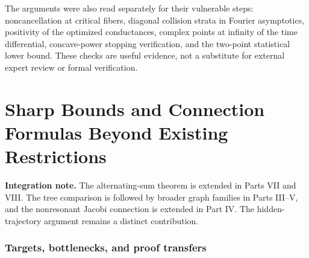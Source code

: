 \documentclass[11pt,a4paper]{article}
\theoremstyle{definition}
\theoremstyle{remark}
\numberwithin{equation}{section}
\newcommand{\collectedpart}[1]{%
 \clearpage\part{#1}%
 \setcounter{section}{0}%
 \renewcommand{\thesection}{\Roman{part}.\arabic{section}}%
 \renewcommand{\theHsection}{p\arabic{part}.s\arabic{section}}%
 \renewcommand{\arraystretch}{1}%
}
\begin{document}
The arguments were also read separately for their vulnerable steps:
noncancellation at critical fibers, diagonal collision strata in Fourier
asymptotics, positivity of the optimized conductances, complex points at
infinity of the time differential, concave-power stopping verification,
and the two-point statistical lower bound. These checks are useful evidence,
not a substitute for external expert review or formal verification.



\collectedpart{Sharp Bounds and Connection Formulas Beyond Existing Restrictions}\label{part:2}

\begin{abstract}
We give four independent results that remove a stated restriction or
determine a previously unmatched boundary in a specified problem.
First, the worst ratio between the total effective resistance obtained
by normalized infinity Lewis weights and its optimum on an $n$-vertex
tree is $\sqrt n/8+1/2+O(n^{-1/2})$.  Balanced double-brooms attain this
bound.  They disprove the logarithmic approximation conjecture in
Suliman--Weinstein's 2023 preprint, and a rational certificate contradicts
its stated constant tree bound.  Second, McIntosh's alternating binomial
sums have minimum recurrence width $\lfloor r/2\rfloor$ for every integer
$r\ge2$, removing the prime-or-power-of-two restriction in his minimality
theorem.  Even a recurrence with arbitrary gaps requires at least
$\lfloor r/2\rfloor+1$ nonzero summands.  Third, we determine the
physical-density Frobenius connection coefficients for Jacobi traces
in a nonresonant real-parameter range, extending the integer-parameter
formula of Forrester--Kumar.  Finally, for a specified known-emission
refresh model observed along one stationary path, the population minimax
risk on $\rho\in[r,1-q]$ is
$\Theta(\min\{1,n^{-1/2}(r^{-2}+q^{-1/2})\})$.
The low-persistence lower bound uses a uniform full-history filtering
argument; the nearly frozen bound counts fresh latent draws.
All constructions and proof assumptions are stated explicitly.
\end{abstract}

\noindent\textbf{Integration note.} The alternating-sum theorem is extended in Parts VII and VIII. The tree comparison is followed by broader graph families in Parts III--V, and the nonresonant Jacobi connection is extended in Part IV. The hidden-trajectory argument remains a distinct contribution.
\clearpage

\section{Targets, bottlenecks, and proof transfers}
\end{document}
